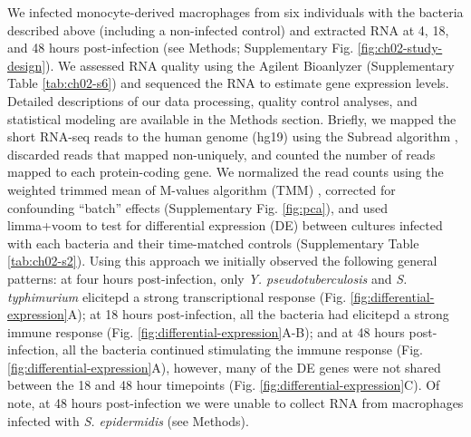 We infected monocyte-derived macrophages from six individuals with the
bacteria described above (including a non-infected control) and
extracted RNA at 4, 18, and 48 hours post-infection (see Methods;
Supplementary Fig. \ref{fig:ch02-study-design}). We assessed RNA quality using the Agilent
Bioanlyzer (Supplementary Table \ref{tab:ch02-s6}) and sequenced the RNA to estimate
gene expression levels. Detailed descriptions of our data processing,
quality control analyses, and statistical modeling are available in
the Methods section. Briefly, we mapped the short RNA-seq reads to the
human genome (hg19) using the Subread algorithm \citep{Liao2013},
discarded reads that mapped non-uniquely, and counted the number of
reads mapped to each protein-coding gene. We normalized the read
counts using the weighted trimmed mean of M-values algorithm (TMM)
\citep{Robinson2010}, corrected for confounding ``batch'' effects
(Supplementary Fig. \ref{fig:pca}), and used limma+voom \citep{Smyth2004,
  Smyth2005, Law2014} to test for differential expression (DE) between
cultures infected with each bacteria and their time-matched controls
(Supplementary Table \ref{tab:ch02-s2}). Using this approach we initially observed
the following general patterns: at four hours post-infection, only
\emph{Y. pseudotuberculosis} and \emph{S. typhimurium} elicitepd a
strong transcriptional response (Fig.
\ref{fig:differential-expression}A); at 18 hours post-infection, all
the bacteria had elicitepd a strong immune response
(Fig. \ref{fig:differential-expression}A-B); and at 48 hours
post-infection, all the bacteria continued stimulating the immune
response (Fig. \ref{fig:differential-expression}A), however, many of
the DE genes were not shared between the 18 and 48 hour timepoints
(Fig. \ref{fig:differential-expression}C). Of note, at 48 hours
post-infection we were unable to collect RNA from macrophages infected
with \emph{S.  epidermidis} (see Methods).

